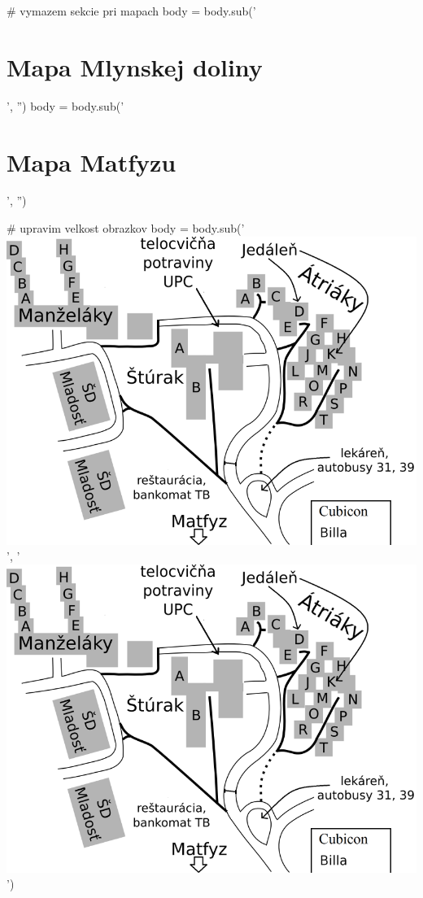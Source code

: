 \documentclass[11pt,slovak,twosides,openany]{scrbook}
\begin{document}
# vymazem sekcie pri mapach
body = body.sub('\section{Mapa Mlynskej doliny}\hypertarget{mapa-mlynskej-doliny}{}\label{mapa-mlynskej-doliny}', '')
body = body.sub('\section{Mapa Matfyzu}\hypertarget{mapa-matfyzu}{}\label{mapa-matfyzu}', '')

# upravim velkost obrazkov
body = body.sub('\includegraphics{images/mapa-horiz_w.png}', '\includegraphics[width=1\textwidth]{images/mapa-horiz_w.png}')
\end{document}
